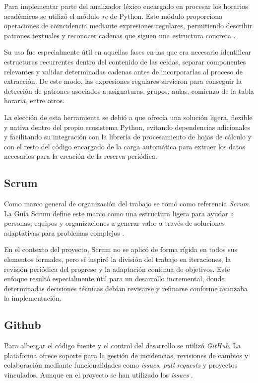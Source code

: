 Para implementar parte del analizador léxico encargado en procesar los horarios académicos se utilizó el módulo \textit{re} de Python. Este módulo proporciona operaciones de coincidencia mediante expresiones regulares, permitiendo describir patrones textuales y reconocer cadenas que siguen una estructura concreta \cite{python_re_docs, python_regex_howto}.

Su uso fue especialmente útil en aquellas fases en las que era necesario identificar estructuras recurrentes dentro del contenido de las celdas, separar componentes relevantes y validar determinadas cadenas antes de incorporarlas al proceso de extracción. De este modo, las expresiones regulares sirvieron para conseguir la detección de patrones asociados a asignaturas, grupos, aulas, comienzo de la tabla horaria, entre otros.

La elección de esta herramienta se debió a que ofrecía una solución ligera, flexible y nativa dentro del propio ecosistema Python, evitando dependencias adicionales y facilitando su integración con la librería de procesamiento de hojas de cálculo y con el resto del código encargado de la carga automática para extraer los datos necesarios para la creación de la reserva periódica.

\subsection{Scrum}

Como marco general de organización del trabajo se tomó como referencia \textit{Scrum}. La Guía Scrum define este marco como una estructura ligera para ayudar a personas, equipos y organizaciones a generar valor a través de soluciones adaptativas para problemas complejos \cite{scrum_guide}.

En el contexto del proyecto, Scrum no se aplicó de forma rígida en todos sus elementos formales, pero sí inspiró la división del trabajo en iteraciones, la revisión periódica del progreso y la adaptación continua de objetivos. Este enfoque resultó especialmente útil para un desarrollo incremental, donde determinadas decisiones técnicas debían revisarse y refinarse conforme avanzaba la implementación.

\subsection{Github}

Para albergar el código fuente y el control del desarrollo se utilizó \textit{GitHub}. La plataforma ofrece soporte para la gestión de incidencias, revisiones de cambios y colaboración mediante funcionalidades como \textit{issues}, \textit{pull requests} y proyectos vinculados. Aunque en el proyecto se han utilizado los \textit{issues} \cite{github_issues}.

